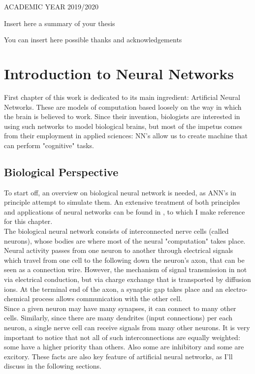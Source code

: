 \documentclass[%
    corpo=11pt,
    twoside,
    stile=classica,
    oldstyle,
    autoretitolo,
    tipotesi=magistrale,
    greek,
    evenboxes,
    english
]{toptesi}
\begin{document}
\centerline{ACADEMIC YEAR 2019/2020}






\sommario

Insert here a summary of your thesis

\ringraziamenti

You can insert here possible thanks and acknowledgements

\tablespagetrue\figurespagetrue %
\indici

\mainmatter

\chapter{Introduction to Neural Networks}
First chapter of this work is dedicated to its main ingredient: Artificial Neural Networks. These are models of computation based loosely on the way in which the brain is believed to work. Since their invention, biologists are interested in using such networks to model biological brains, but most of the impetus comes from their employment in applied sciences: NN's allow us to create machine that can perform "cognitive" tasks.
\section{Biological Perspective}
To start off, an overview on biological neural network is needed, as ANN's in principle attempt to simulate them. An extensive treatment of both principles and applications of neural networks can be found in \cite{graupe}, to which I make reference for this chapter. \\
The biological neural network consists of interconnected nerve cells (called neurons), whose bodies are where most of the neural "computation" takes place. Neural activity passes from one neuron to another through electrical signals which travel from one cell to the following down the neuron's axon, that can be seen as a connection wire. However, the mechanism of signal transmission in not via electrical conduction, but via charge exchange that is transported by diffusion ions. At the terminal end of the axon, a synaptic gap takes place and an electro-chemical process allows communication with the other cell. \\
Since a given neuron may have many synapses, it can connect to many other cells. Similarly, since there are many dendrites (input connections) per each neuron, a single nerve cell can receive signals from many other neurons. It is very important to notice that not all of such interconnections are equally weighted: some have a higher priority than others. Also some are inhibitory and some are excitory. These facts are also key feature of artificial neural networks, as I'll discuss in the following sections.
\end{document}
